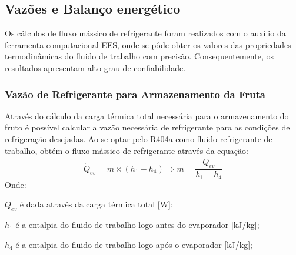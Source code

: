 \documentclass[10pt,a4paper]{article}
\begin{document}
\newpage
\subsection{{ Vazões e Balanço energético}}
Os cálculos de fluxo mássico de refrigerante foram realizados com o auxílio da ferramenta computacional EES, onde se pôde obter os valores das propriedades termodinâmicas do fluido de trabalho com precisão. Consequentemente, os resultados apresentam alto grau de confiabilidade.



\subsubsection{{Vazão de Refrigerante para Armazenamento da Fruta}}
Através do cálculo da carga térmica total necessária para o armazenamento do fruto é possível calcular a vazão necessária de refrigerante para as condições de refrigeração desejadas. Ao se optar pelo R404a como fluido refrigerante de trabalho,  obtém o fluxo mássico de refrigerante através da equação:
\begin{equation}
    \dot{Q}_{ev} = \dot{m} \times (h_1-h_4) \Rightarrow \dot{m} = \frac{\dot{Q}_{ev}}{h_1 - h_4}
    \label{eq:qev}
\end{equation}
Onde:

$Q_{ev}$ é dada através da carga térmica total [W];

$h_1$ é a entalpia do fluido de trabalho logo antes do evaporador [kJ/kg];

$h_4$ é a entalpia do fluido de trabalho logo após o evaporador [kJ/kg];
\end{document}
